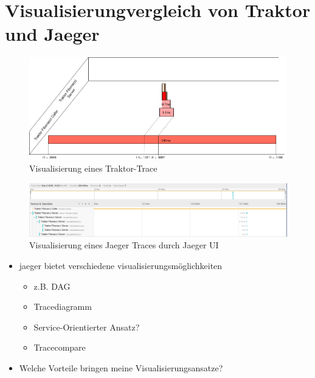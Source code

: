 \section{Visualisierungvergleich von Traktor und Jaeger}
\label{section:Visualisierungvergleich von Traktor und Jaeger}
\begin{figure}[!ht]
	\centering
	\includegraphics[scale=0.4]{img/Evaluation/Eval_TraktorEnv.png}
	\caption[Visualisierung eines Traktor-Trace]{Visualisierung eines Traktor-Trace}
	\label{fig:Eval_TraktorEnv}
\end{figure}


\begin{landscape}
	\begin{figure}
		\hspace*{-130pt}
		\includegraphics[scale=0.55]{img/Evaluation/Trace_Dist.png}
		\caption[Visualisierung eines Jaeger Traces durch Jaeger UI]{Visualisierung eines Jaeger Traces durch Jaeger UI}
		\label{fig:Trace_Dist}
	\end{figure}
\end{landscape}

\begin{itemize}
	\item jaeger bietet verschiedene visualisierungsmöglichkeiten
	\begin{itemize}
		\item z.B. DAG
		\item Tracediagramm
		\item Service-Orientierter Ansatz?
		\item Tracecompare
	\end{itemize}
	\item Welche Vorteile bringen meine Visualisierungsansatze?
\end{itemize}
